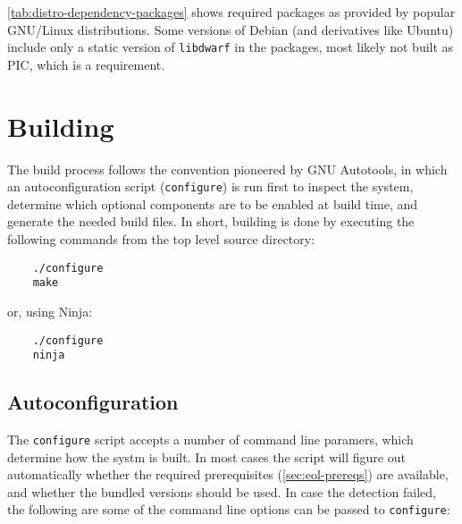 \autoref{tab:distro-dependency-packages} shows required packages as provided
by popular GNU/Linux distributions. Some versions of Debian (and derivatives
like Ubuntu) include only a static version of \verb|libdwarf| in the packages,
most likely not built as \gls{PIC}, which is a requirement.


\section{Building}

The build process follows the convention pioneered by GNU Autotools, in which
an autoconfiguration script (\verb|configure|) is run first to inspect the
system, determine which optional components are to be enabled at build
time, and generate the needed build files. In short, building \Eol* is done
by executing the following commands from the top level source directory:

\begin{verbatim}
	./configure
	make
\end{verbatim}

or, using Ninja:

\begin{verbatim}
	./configure
	ninja
\end{verbatim}


\subsection{Autoconfiguration}
  \label{sec:running-configure}

The \verb|configure| script accepts a number of command line paramers, which
determine how the systm is built. In most cases the script will figure out
automatically whether the required prerequisites (\autoref{sec:eol-prereqs})
are available, and whether the bundled versions should be used. In case the
detection failed, the following are some of the command line options can be
passed to \verb|configure|:

